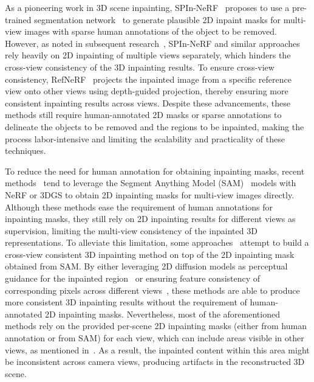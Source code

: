 As a pioneering work in 3D scene inpainting, SPIn-NeRF~\cite{mirzaei2023spin} proposes to use a pre-trained segmentation network~\cite{hao2021edgeflow} to generate plausible 2D inpaint masks for multi-view images with sparse human annotations of the object to be removed. However, as noted in subsequent research~\cite {lin2024maldnerf, wang2024gscream}, SPIn-NeRF and similar approaches~\cite{weder2023removingnerf, yin2023ornerf} rely heavily on 2D inpainting of multiple views separately, which hinders the cross-view consistency of the 3D inpainting results. To ensure cross-view consistency, RefNeRF~\cite{mirzaei2023referenceinpaint}
projects the inpainted image from a specific reference view onto other views using depth-guided projection, thereby ensuring more consistent inpainting results across views. Despite these advancements, these methods still require human-annotated 2D masks or sparse annotations to delineate the objects to be removed and the regions to be inpainted, making the process labor-intensive and limiting the scalability and practicality of these techniques.

To reduce the need for human annotation for obtaining inpainting masks, recent methods~\cite{ye2023gaussiangrouping, yin2023ornerf} tend to leverage the Segment Anything Model (SAM)~\cite{kirillov2023sam} 
models with NeRF or 3DGS to obtain 2D inpainting masks for multi-view images directly. Although these methods ease the requirement of human annotations for inpainting masks, they still rely on 2D inpainting results for different views as supervision, limiting the multi-view consistency of the inpainted 3D representations. To alleviate this limitation, some approaches~\cite{lin2024maldnerf, chen2024mvip, wang2024gscream, mirzaei2024reffusion, liu2024infusion, weber2024nerfiller} attempt to build a cross-view consistent 3D inpainting method on top of the 2D inpainting mask obtained from SAM. By either leveraging 2D diffusion models as perceptual guidance for the inpainted region~\cite{chen2024mvip, lin2024maldnerf, weber2024nerfiller} or ensuring feature consistency of corresponding pixels across different views~\cite{wang2024gscream}, these methods are able to produce more consistent 3D inpainting results without the requirement of human-annotated 2D inpainting masks. Nevertheless, most of the aforementioned methods rely on the provided per-scene 2D inpainting masks (either from human annotation or from SAM) for each view, which can include areas visible in other views, as mentioned in~\cite{ye2023gaussiangrouping}. As a result, the inpainted content within this area might be inconsistent across camera views, producing artifacts in the reconstructed 3D scene. 
% 

